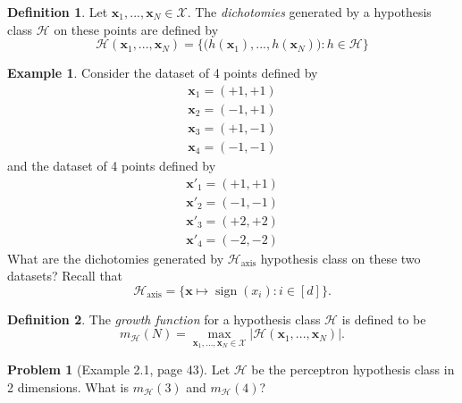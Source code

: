 \documentclass[10pt]{exam}
\theoremstyle{definition}
\newtheorem{problem}{Problem}
\newtheorem{example}{Example}
\newtheorem{defn}{Definition}
\DeclareMathOperator{\sign}{sign}
\newcommand{\x}{\mathbf x}
\newcommand{\mH}{m_{\mathcal H}}
\newcommand{\HH}[1]{\mathcal H_{\text{#1}}}
\begin{document}
\begin{defn}
    Let $\x_1,...,\x_N \in \mathcal X$.
    The \emph{dichotomies} generated by a hypothesis class $\mathcal H$ on these points are defined by
    \begin{equation}
        \mathcal H(\x_1, ..., \x_N) = \bigg\{ \big(h(\x_1), ..., h(\x_N)\big) : h \in \mathcal H \bigg\}
    \end{equation}
\end{defn}

\begin{example}
    Consider the dataset of 4 points defined by
    \begin{align*}
    \x_1 = (+1,+1) \\
    \x_2 = (-1,+1) \\
    \x_3 = (+1,-1) \\
    \x_4 = (-1,-1)
    \end{align*}
    and the dataset of 4 points defined by
    \begin{align*}
    \x'_1 = (+1,+1) \\
    \x'_2 = (-1,-1) \\
    \x'_3 = (+2,+2) \\
    \x'_4 = (-2,-2)
    \end{align*}
    What are the dichotomies generated by $\HH{axis}$ hypothesis class on these two datasets?
    Recall that
    \begin{equation*}
    \HH{axis} = \bigg\{ \x \mapsto \sign(x_i) : i \in [d] \bigg\}.
    \end{equation*}
\end{example}



\newpage
\begin{defn}
    The \emph{growth function} for a hypothesis class $\mathcal H$ is defined to be
    \begin{equation}
        m_{\mathcal H}(N) = \max_{\x_1,...,\x_N\in\mathcal X} \big| \mathcal H(\x_1, ..., \x_N) \big|.
    \end{equation}
\end{defn}
\begin{problem}
    [Example 2.1, page 43]
    Let $\mathcal H$ be the perceptron hypothesis class in 2 dimensions.
    What is $\mH(3)$ and $\mH(4)$?
\end{problem}
\vspace{2in}
\end{document}
